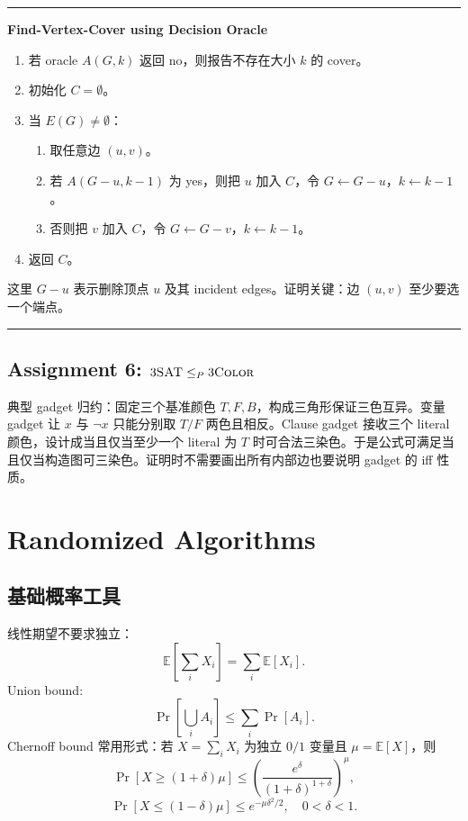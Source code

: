 \documentclass[UTF8,a4paper,11pt]{ctexart}
\newenvironment{algobox}[1]
{\par\medskip\noindent\begin{minipage}{0.96\linewidth}\hrule\vspace{0.35em}\textbf{#1}\par\vspace{0.25em}\small}
{\par\vspace{0.25em}\hrule\end{minipage}\par\medskip}
\begin{document}
\begin{algobox}{Find-Vertex-Cover using Decision Oracle}
\begin{enumerate}
  \item 若 oracle $A(G,k)$ 返回 no，则报告不存在大小 $k$ 的 cover。
  \item 初始化 $C=\emptyset$。
  \item 当 $E(G)\ne\emptyset$：
  \begin{enumerate}
    \item 取任意边 $(u,v)$。
    \item 若 $A(G-u,k-1)$ 为 yes，则把 $u$ 加入 $C$，令 $G\leftarrow G-u$，$k\leftarrow k-1$。
    \item 否则把 $v$ 加入 $C$，令 $G\leftarrow G-v$，$k\leftarrow k-1$。
  \end{enumerate}
  \item 返回 $C$。
\end{enumerate}
这里 $G-u$ 表示删除顶点 $u$ 及其 incident edges。证明关键：边 $(u,v)$ 至少要选一个端点。
\end{algobox}

\subsection{Assignment 6: $3\textsc{SAT}\le_P 3\textsc{Color}$}

典型 gadget 归约：固定三个基准颜色 $T,F,B$，构成三角形保证三色互异。变量 gadget 让 $x$ 与 $\neg x$ 只能分别取 $T/F$ 两色且相反。Clause gadget 接收三个 literal 颜色，设计成当且仅当至少一个 literal 为 $T$ 时可合法三染色。于是公式可满足当且仅当构造图可三染色。证明时不需要画出所有内部边也要说明 gadget 的 iff 性质。

\section{Randomized Algorithms}

\subsection{基础概率工具}

线性期望不要求独立：
\[
\mathbb E\left[\sum_i X_i\right]=\sum_i\mathbb E[X_i].
\]
Union bound:
\[
\Pr\left[\bigcup_i A_i\right]\le \sum_i\Pr[A_i].
\]
Chernoff bound 常用形式：若 $X=\sum_i X_i$ 为独立 $0/1$ 变量且 $\mu=\mathbb E[X]$，则
\[
\Pr[X\ge (1+\delta)\mu]\le \left(\frac{e^\delta}{(1+\delta)^{1+\delta}}\right)^\mu,
\]
\[
\Pr[X\le (1-\delta)\mu]\le e^{-\mu\delta^2/2},\quad 0<\delta<1.
\]
\end{document}
